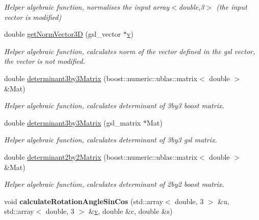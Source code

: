 \begin{DoxyCompactItemize}
\begin{DoxyCompactList}\small\item\em Helper algebraic function, normalises the input array$<$double,3$>$ (the input vector is modified) \end{DoxyCompactList}\item 
\hypertarget{classShapeBase_a38c436dca2006e445f7949bc34f08e3c}{}double \hyperlink{classShapeBase_a38c436dca2006e445f7949bc34f08e3c}{get\+Norm\+Vector3\+D} (gsl\+\_\+vector $\ast$\hyperlink{classShapeBase_a8b4c2d3bfbc6c9785c5181a56f929151}{v})\label{classShapeBase_a38c436dca2006e445f7949bc34f08e3c}

\begin{DoxyCompactList}\small\item\em Helper algebraic function, calculates norm of the vector defined in the gsl vector, the vector is not modified. \end{DoxyCompactList}\item 
\hypertarget{classShapeBase_ad86161effaf1c7c607aba51609a99e70}{}double \hyperlink{classShapeBase_ad86161effaf1c7c607aba51609a99e70}{determinant3by3\+Matrix} (boost\+::numeric\+::ublas\+::matrix$<$ double $>$ \&Mat)\label{classShapeBase_ad86161effaf1c7c607aba51609a99e70}

\begin{DoxyCompactList}\small\item\em Helper algebraic function, calculates determinant of 3by3 boost matrix. \end{DoxyCompactList}\item 
\hypertarget{classShapeBase_af52dce091d2e8369f546df9adeb1e6c0}{}double \hyperlink{classShapeBase_af52dce091d2e8369f546df9adeb1e6c0}{determinant3by3\+Matrix} (gsl\+\_\+matrix $\ast$Mat)\label{classShapeBase_af52dce091d2e8369f546df9adeb1e6c0}

\begin{DoxyCompactList}\small\item\em Helper algebraic function, calculates determinant of 3by3 gsl matrix. \end{DoxyCompactList}\item 
\hypertarget{classShapeBase_a32f1a594c4be91e71f567cc04290a7f5}{}double \hyperlink{classShapeBase_a32f1a594c4be91e71f567cc04290a7f5}{determinant2by2\+Matrix} (boost\+::numeric\+::ublas\+::matrix$<$ double $>$ \&Mat)\label{classShapeBase_a32f1a594c4be91e71f567cc04290a7f5}

\begin{DoxyCompactList}\small\item\em Helper algebraic function, calculates determinant of 2by2 boost matrix. \end{DoxyCompactList}\item 
\hypertarget{classShapeBase_a8334f4c3c865792f57ffb456ea61212b}{}void {\bfseries calculate\+Rotation\+Angle\+Sin\+Cos} (std\+::array$<$ double, 3 $>$ \&u, std\+::array$<$ double, 3 $>$ \&\hyperlink{classShapeBase_a8b4c2d3bfbc6c9785c5181a56f929151}{v}, double \&c, double \&s)\label{classShapeBase_a8334f4c3c865792f57ffb456ea61212b}


\end{DoxyCompactItemize}

